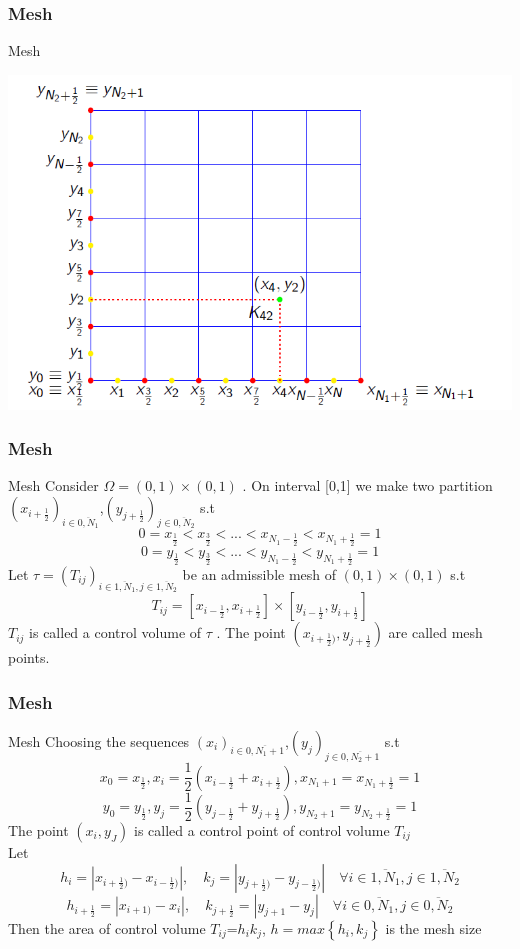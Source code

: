 \documentclass[11pt]{beamer}
\numberwithin{equation}{section}
\theoremstyle{plain}
\theoremstyle{definition}
\theoremstyle{remark}
\begin{document}
\begin{frame}\frametitle{Mesh}
\begin{block}{Mesh}
\begin{center}
\includegraphics[scale=0.35]{1}
\end{center}
\end{block}
\end{frame}

\begin{frame}\frametitle{Mesh}
\begin{block}{Mesh}
Consider $\Omega = (0,1) \times (0,1)$ . On interval [0,1] we make two partition $(x_{i+\frac{1}{2}})_{i\in \overline{0,N_1}}$,$(y_{j+\frac{1}{2}})_{j\in \overline{0,N_2}}$ s.t
$$0=x_{\frac{1}{2}}< x_{\frac{3}{2}} < ... < x_{N_1-\frac{1}{2}} < x_{N_1+\frac{1}{2}} =1 $$ 
$$0=y_{\frac{1}{2}}< y_{\frac{3}{2}} < ... < y_{N_1-\frac{1}{2}} < y_{N_1+\frac{1}{2}} =1 $$ 
Let $\tau=(T_{ij})_{i\in \overline{1,N_1},j\in \overline{1,N_2}}$ be an admissible mesh of $(0,1) \times (0,1)$ s.t
$$T_{ij}=[x_{i-\frac{1}{2}},x_{i+\frac{1}{2}}] \times [y_{i-\frac{1}{2}},y_{i+\frac{1}{2}}]$$
$T_{ij}$ is called a control volume of $\tau$ . The point $(x_{i+\frac{1}{2})},y_{j+\frac{1}{2}})$ are called mesh points.
\end{block}
\end{frame}

\begin{frame}\frametitle{Mesh}
\begin{block}{Mesh}
Choosing the sequences $(x_{i})_{i\in \overline{0,N_1+1}}$,$(y_{j})_{j\in \overline{0,N_2+1}}$ s.t
$$x_0=x_{\frac{1}{2}},x_i= \frac{1}{2}(x_{i-\frac{1}{2}}+x_{i+\frac{1}{2}}) , x_{N_1+1} = x_{N_1+\frac{1}{2}} =1 $$ 
$$y_0=y_{\frac{1}{2}},y_j= \frac{1}{2}(y_{j-\frac{1}{2}}+y_{j+\frac{1}{2}}) , y_{N_2+1} = y_{N_2+\frac{1}{2}} =1 $$ 
The point $(x_i,y_J)$ is called a control point of control volume $T_{ij}$ \\
Let
$$h_i=|x_{i+\frac{1}{2})}-x_{i-\frac{1}{2})}|, \quad k_j=|y_{j+\frac{1}{2})}-y_{j-\frac{1}{2})}| \quad \forall i\in \overline{1,N_1} ,j\in \overline{1,N_2}$$ 
$$h_{i+\frac{1}{2}}=|x_{i+1)}-x_{i}|, \quad k_{j+\frac{1}{2}}=|y_{j+1}-y_{j}| \quad \forall i\in \overline{0,N_1} ,j\in \overline{0,N_2}$$ 
Then the area of control volume $T_{ij}$=$h_ik_j$, $h=max\left \{ h_i,k_j \right \}$ is the mesh size
\end{block}
\end{frame}
\end{document}
